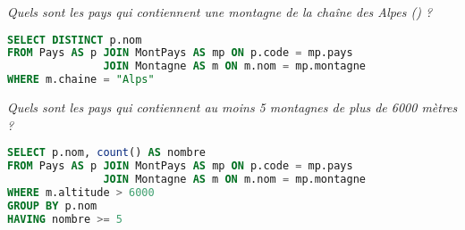\begin{Exercise}
\it Quels sont les pays qui contiennent une montagne de la chaîne des Alpes () ?
\end{Exercise}
\begin{Answer}
\begin{lstlisting}[language=SQL]
SELECT DISTINCT p.nom
FROM Pays AS p JOIN MontPays AS mp ON p.code = mp.pays
               JOIN Montagne AS m ON m.nom = mp.montagne
WHERE m.chaine = "Alps"
\end{lstlisting}
\end{Answer}
\begin{Exercise}
\it Quels sont les pays qui contiennent au moins 5 montagnes de plus de 6000 mètres ?
\end{Exercise}
\begin{Answer}
\begin{lstlisting}[language=SQL]
SELECT p.nom, count() AS nombre
FROM Pays AS p JOIN MontPays AS mp ON p.code = mp.pays
               JOIN Montagne AS m ON m.nom = mp.montagne
WHERE m.altitude > 6000
GROUP BY p.nom
HAVING nombre >= 5
\end{lstlisting}
\end{Answer}

